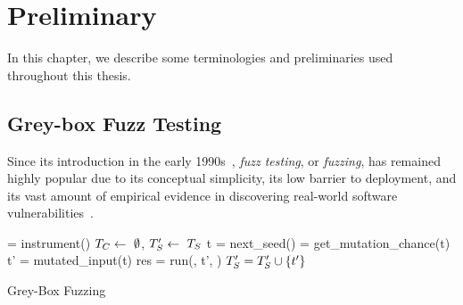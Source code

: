 \chapter{Preliminary} \label{ch:preliminary}

In this chapter, we describe some terminologies and preliminaries used throughout this thesis.

\section{Grey-box Fuzz Testing}
Since its introduction in the early 1990s~\cite{fuzzing1990}, \emph{fuzz testing}, or \emph{fuzzing}, has remained highly popular due to its conceptual simplicity, its low barrier to deployment, and its vast amount of empirical evidence in discovering real-world software vulnerabilities~\cite{fuzz_survey}.

\begin{algorithm}[t]
 \small
{}
	\Prog = instrument(\ProgO) 
	$T_{C} \leftarrow~\emptyset$, $T^{\prime}_{S} \leftarrow~T_{S}$\; 
	 {
		t = next\_seed(\FinalSeeds) 
		\mutChance = get\_mutation\_chance(t)  \label{line:algo:energy}
		 {
			t' = mutated\_input(t)  
			res = run(\Prog, t', \Ncal)
			 {\label{line:algo:new_cov}
				$T^{\prime}_{S} = T^{\prime}_{S}\cup\{t'\}$  \label{line:algo:triage_end}
			}
		}
	}
	\caption{Grey-Box Fuzzing}\label{algo:gbf}
\end{algorithm}

